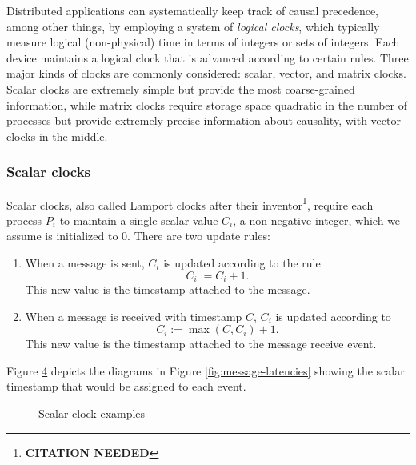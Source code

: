 \documentclass[]             %
{NASA}                       %
\theoremstyle{definition}
\newcommand{\citationneeded}{\footnote{\textbf{CITATION NEEDED}}}
\begin{document}
Distributed applications can systematically keep track of causal
precedence, among other things, by employing a system of \emph{logical
clocks}, which typically measure logical (non-physical) time in terms
of integers or sets of integers. Each device maintains a logical clock
that is advanced according to certain rules. Three major kinds of
clocks are commonly considered: scalar, vector, and matrix
clocks. Scalar clocks are extremely simple but provide the most
coarse-grained information, while matrix clocks require storage space
quadratic in the number of processes but provide extremely precise
information about causality, with vector clocks in the middle.

\subsubsection{Scalar clocks}
Scalar clocks, also called Lamport clocks after their
inventor\citationneeded, require each process $P_i$ to maintain a
single scalar value $C_i$, a non-negative integer, which we assume is
initialized to $0$. There are two update rules:
\begin{enumerate}
\item When a message is sent, $C_i$ is updated according to the rule
  \[C_i := C_i + 1.\]
  This new value is the timestamp attached to the message.
\item When a message is received with timestamp $C$, $C_i$ is updated according to
  \[C_i := \max(C, C_i) + 1.\]
  This new value is the timestamp attached to the message receive event.
\end{enumerate}
Figure \ref{fig:message-latencies-scalar} depicts the diagrams in
Figure \ref{fig:message-latencies} showing the scalar timestamp that
would be assigned to each event.

\begin{figure}[p]
  \setlength\belowcaptionskip{5ex}

  \begin{subfigure}{1\textwidth}
    \centering 
    \label{fig:message-latencies-scalar-a}
  \end{subfigure}

  \begin{subfigure}{1\textwidth}
    \centering 
    \label{fig:message-latencies-scalar-b}
  \end{subfigure}


  \begin{subfigure}{1\textwidth}
    \centering 
    \label{fig:message-latencies-scalar-c}
  \end{subfigure}

  \caption{Scalar clock examples}
  \label{fig:message-latencies-scalar}
\end{figure}
\end{document}
